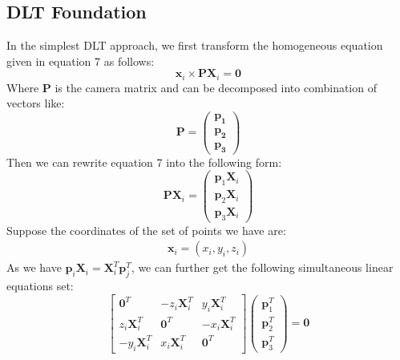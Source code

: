 \documentclass[conference]{IEEEtran}
\newcommand{\mat}[1]{\mathbf{#1}} %
\begin{document}
\subsection{DLT Foundation}
In the simplest DLT approach, we first transform the homogeneous equation given in equation 7 as follows:
\begin{equation}
	\mat{x}_i \times \mat{P}\mat{X}_i = \mat{0}
\end{equation}
Where $\mat{P}$ is the camera matrix and can be decomposed into combination of vectors like:
\begin{equation}
	\mat{P} = \begin{pmatrix}
				\mat{p_1}\\
				\mat{p_2}\\
				\mat{p_3}
		       \end{pmatrix}
\end{equation}
Then we can rewrite equation 7 into the following form:
\begin{equation}
	\mat{P}\mat{X}_i =
	\begin{pmatrix}
		\mat{p}_1\mat{X}_i\\
		\mat{p}_2\mat{X}_i\\
		\mat{p}_3\mat{X}_i
	\end{pmatrix}
\end{equation}
Suppose the coordinates of the set of points we have are:
\begin{equation}
	\begin{split}
		\mat{x}_i = (x_i, y_i, z_i)
	\end{split}
\end{equation}
As we have $\mat{p}_i\mat{X}_i = \mat{X}_i^T \mat{p}_j^T$, we can further get the following simultaneous linear equations set:
\begin{equation}
	\begin{bmatrix}
		\mat{0}^T & -z_i\mat{X}_i^T & y_i\mat{X}_i^T\\
		z_i\mat{X}_i^T & \mat{0}^T & -x_i\mat{X}_i^T\\
		-y_i\mat{X}_i^T & x_i\mat{X}_i^T & \mat{0}^T
	\end{bmatrix}
	\begin{pmatrix}
		\mat{p}_1^T\\
		\mat{p}_2^T\\
		\mat{p}_3^T
	\end{pmatrix} = \mat{0}
\end{equation}
\end{document}
